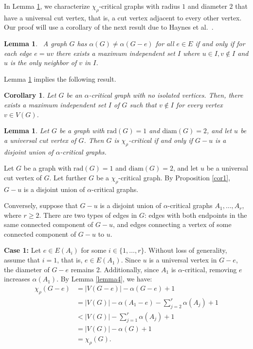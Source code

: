 \documentclass[12pt]{article}
\newtheorem{lemma}[theorem]{Lemma}
\newtheorem{corollary}[theorem]{Corollary}
\newcommand{\proof}{\noindent{\bf Proof.\ }}
\newcommand{\ie}{that is}
\begin{document}
In Lemma \ref{thm:iff-universal-cut}, we characterize $\chi_\rho$-critical graphs with radius $1$ and diameter $2$ that have a universal cut vertex, \ie, a cut vertex adjacent to every other vertex.
Our proof will use a corollary of the next result due to Haynes et al.~\cite{haynes-1990}.

\begin{lemma}~{\rm \cite{haynes-1990}}\label{teo2}
A graph $G$ has $\alpha(G) \neq \alpha(G-e)$ for all  $e \in E$  if and only if for each edge $e=u v$ there exists a maximum independent set $I$ where $u \in I, v \notin I$ and $u$ is the only neighbor of $v$ in $I$.
\end{lemma}

Lemma \ref{teo2} implies the following result.

\begin{corollary}\label{cor:haynes}
Let $G$ be an $\alpha$-critical graph with no isolated vertices. Then, there exists a maximum independent set $I$ of $G$ such that $v \notin I$ for every vertex $v \in V(G)$.
\end{corollary}

\begin{lemma}\label{thm:iff-universal-cut}
Let $G$ be a graph with $\mathrm{rad}(G) = 1$  and  $\mathrm{diam}(G) = 2$, and let $u$ be a universal cut vertex of $G$. 
Then $G$ is $\chi_\rho$-critical if and only if $G-u$ is a disjoint union of $\alpha$-critical graphs. 
\end{lemma}

\proof	Let $G$ be a graph with $\mathrm{rad}(G) = 1$  and  $\mathrm{diam}(G) = 2$, and let $u$ be a universal cut vertex of $G$. Let further $G$ be a $\chi_\rho$-critical graph. By Proposition \ref{cor1}, $G-u$ is a disjoint union of $\alpha$-critical graphs. 

Conversely, suppose that $G - u$ is a disjoint union of $\alpha$-critical graphs $A_1, \dots, A_r$, where $r \ge 2$. There are two types of edges in $G$: edges with both endpoints in the same connected component of $G-u$, and edges connecting a vertex of some connected component of $G-u$ to $u$.
	
\textbf{Case 1:} Let $e \in E(A_i)$ for some $i \in \{1,\dots,r\}$. Without loss of generality, assume that \( i = 1 \), \ie, \( e \in E(A_1) \).
Since $u$ is a universal vertex in $G-e$, the diameter of $G-e$ remains 2. Additionally, since $A_1$ is $\alpha$-critical, removing $e$ increases $\alpha\left(A_1\right)$. By Lemma \ref{lemma4}, we have:
\begin{align*}
\chi_\rho(G-e)&=|V(G-e)| - \alpha(G-e)  + 1 \\&=|V(G)|-\alpha(A_1-e)-\sum_{j=2}^{r} \alpha(A_j) + 1
\\ &<|V(G)| - \sum_{j=1}^{r} \alpha(A_j) + 1 \\ &=|V(G)| - \alpha(G)  + 1\\ &=\chi_\rho(G).
\end{align*}
\end{document}
